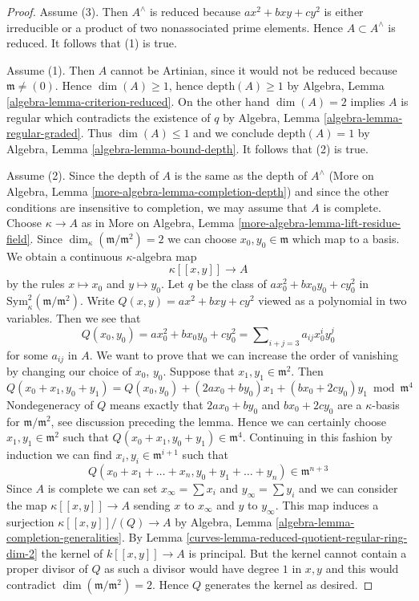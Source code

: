 \begin{proof}

Assume (3). Then $A^\wedge$ is reduced because $ax^2 + bxy + cy^2$
is either irreducible or a product of two nonassociated prime elements.
Hence $A \subset A^\wedge$ is reduced. It follows that (1) is true.

\medskip\noindent
Assume (1). Then $A$ cannot be Artinian, since it would not be reduced
because $\mathfrak m \not = (0)$.
Hence $\dim(A) \geq 1$, hence $\text{depth}(A) \geq 1$
by Algebra, Lemma \ref{algebra-lemma-criterion-reduced}.
On the other hand $\dim(A) = 2$ implies $A$ is regular
which contradicts the existence of $q$ by
Algebra, Lemma \ref{algebra-lemma-regular-graded}.
Thus $\dim(A) \leq 1$ and we conclude $\text{depth}(A) = 1$
by Algebra, Lemma \ref{algebra-lemma-bound-depth}.
It follows that (2) is true.

\medskip\noindent
Assume (2). Since the depth of $A$ is the same as the depth of $A^\wedge$
(More on Algebra, Lemma \ref{more-algebra-lemma-completion-depth})
and since the other conditions are insensitive to completion, we may
assume that $A$ is complete. Choose $\kappa \to A$ as in
More on Algebra, Lemma \ref{more-algebra-lemma-lift-residue-field}.
Since $\dim_\kappa(\mathfrak m/\mathfrak m^2) = 2$ we can choose
$x_0, y_0 \in \mathfrak m$ which map to a basis.
We obtain a continuous $\kappa$-algebra map
$$
\kappa[[x, y]] \longrightarrow A
$$
by the rules $x \mapsto x_0$ and $y \mapsto y_0$. Let
$q$ be the class of $ax_0^2 + bx_0y_0 + cy_0^2$ in
$\text{Sym}^2_\kappa(\mathfrak m/\mathfrak m^2)$.
Write $Q(x, y) = ax^2 + bxy + cy^2$ viewed as a polynomial
in two variables. Then we see that
$$
Q(x_0, y_0) = ax_0^2 + bx_0y_0 + cy_0^2 =
\sum\nolimits_{i + j = 3} a_{ij} x_0^iy_0^j
$$
for some $a_{ij}$ in $A$. We want to prove that we can
increase the order of vanishing by changing our choice
of $x_0$, $y_0$. Suppose that $x_1, y_1 \in \mathfrak m^2$.
Then
$$
Q(x_0 + x_1, y_0 + y_1) = Q(x_0, y_0) +
(2ax_0 + by_0)x_1 + (bx_0 + 2cy_0)y_1 \bmod \mathfrak m^4
$$
Nondegeneracy of $Q$ means exactly that $2ax_0 + by_0$ and $bx_0 + 2cy_0$
are a $\kappa$-basis for $\mathfrak m/\mathfrak m^2$, see discussion
preceding the lemma. Hence we can
certainly choose $x_1, y_1 \in \mathfrak m^2$ such that
$Q(x_0 + x_1, y_0 + y_1) \in \mathfrak m^4$.
Continuing in this fashion by induction
we can find $x_i, y_i \in \mathfrak m^{i + 1}$
such that
$$
Q(x_0 + x_1 + \ldots + x_n, y_0 + y_1 + \ldots + y_n) \in \mathfrak m^{n + 3}
$$
Since $A$ is complete we can set
$x_\infty = \sum x_i$ and $y_\infty = \sum y_i$
and we can consider the map $\kappa[[x, y]] \longrightarrow A$
sending $x$ to $x_\infty$ and $y$ to $y_\infty$. This map
induces a surjection $\kappa[[x, y]]/(Q) \longrightarrow A$ by
Algebra, Lemma \ref{algebra-lemma-completion-generalities}.
By Lemma \ref{curves-lemma-reduced-quotient-regular-ring-dim-2}
the kernel of $k[[x, y]] \to A$ is principal.
But the kernel cannot contain a proper divisor of $Q$
as such a divisor would have degree $1$ in $x, y$
and this would contradict $\dim(\mathfrak m/\mathfrak m^2) = 2$.
Hence $Q$ generates the kernel as desired.
\end{proof}

